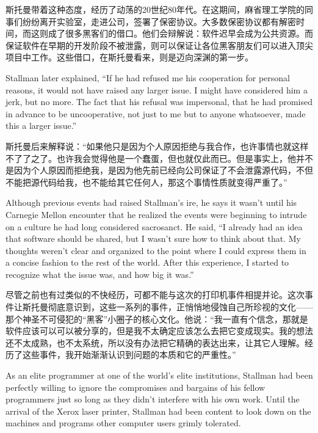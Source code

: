 \ifdefined\chs
斯托曼带着这种态度，经历了动荡的20世纪80年代。在这期间，麻省理工学院的同事们纷纷离开实验室，走进公司，签署了保密协议。大多数保密协议都有解密时间，而这则成了很多黑客们的借口。他们会辩解说：软件迟早会成为公共资源。而保证软件在早期的开发阶段不被泄露，则可以保证让各位黑客朋友们可以进入顶尖项目中工作。这些借口，在斯托曼看来，则是迈向深渊的第一步。
\fi
\fi

\ifdefined\vtwo
\ifdefined\eng
Stallman later explained, ``If he had refused me his cooperation for personal reasons, it would not have raised any larger issue. I might have considered him a jerk, but no more. The fact that his refusal was impersonal, that he had promised in advance to be uncooperative, not just to me but to anyone whatsoever, made this a larger issue.''
\fi

\ifdefined\chs
斯托曼后来解释说：``如果他只是因为个人原因拒绝与我合作，也许事情也就这样不了了之了。也许我会觉得他是一个蠢蛋，但也就仅此而已。但是事实上，他并不是因为个人原因而拒绝我，是因为他先前已经向公司保证了不会泄露源代码，不但不能把源代码给我，也不能给其它任何人，那这个事情性质就变得严重了。''
\fi

\ifdefined\eng
Although previous events had raised Stallman's ire, he says it wasn't until his Carnegie Mellon encounter that he realized the events were beginning to intrude on a culture he had long considered sacrosanct. He said, ``I already had an idea that software should be shared, but I wasn't sure how to think about that. My thoughts weren't clear and organized to the point where I could express them in a concise fashion to the rest of the world. After this experience, I started to recognize what the issue was, and how big it was.''
\fi

\ifdefined\chs
尽管之前也有过类似的不快经历，可都不能与这次的打印机事件相提并论。这次事件让斯托曼彻底意识到，这些一系列的事件，正悄悄地侵蚀自己所珍视的文化——那个神圣不可侵犯的``黑客''小圈子的核心文化。他说：``我一直有个信念，那就是软件应该可以可以被分享的，但是我不太确定应该怎么去把它变成现实。我的想法还不太成熟，也不太系统，所以没有办法把它精确的表达出来，让其它人理解。经历了这些事件，我开始渐渐认识到问题的本质和它的严重性。''
\fi

\ifdefined\eng
As an elite programmer at one of the world's elite institutions, Stallman had been perfectly willing to ignore the compromises and bargains of his fellow programmers just so long as they didn't interfere with his own work. Until the arrival of the Xerox laser printer, Stallman had been content to look down on the machines and programs other computer users grimly tolerated.
\fi

